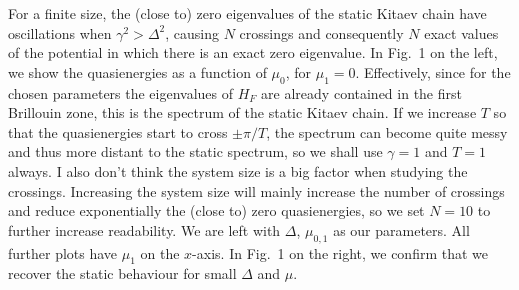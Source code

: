 \documentclass[11pt]{report}
\begin{document}
For a finite size, the (close to) zero eigenvalues of the static Kitaev chain have oscillations when $\gamma^2 > \Delta^2$, causing $N$ crossings and consequently $N$ exact values of the potential in which there is an exact zero eigenvalue\cite{Gregoire2017,Ivo2017}. In Fig.~1 on the left, we show the quasienergies as a function of $\mu_0$, for $\mu_1 = 0$. Effectively, since for the chosen parameters the eigenvalues of $H_F$ are already contained in the first Brillouin zone, this is the spectrum of the static Kitaev chain. If we increase $T$ so that the quasienergies start to cross $\pm \pi/T$, the spectrum can become quite messy and thus more distant to the static spectrum, so we shall use $\gamma = 1$ and $T = 1$ always. I also don't think the system size is a big factor when studying the crossings. Increasing the system size will mainly increase the number of crossings and reduce exponentially the (close to) zero quasienergies, so we set $N = 10$ to further increase readability. We are left with $\Delta$, $\mu_{0,1}$ as our parameters. All further plots have $\mu_1$ on the $x$-axis. In Fig.~1 on the right, we confirm that we recover the static behaviour for small $\Delta$ and $\mu$.
\end{document}
